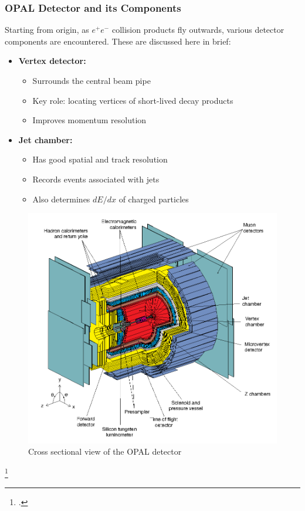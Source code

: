 \documentclass[10pt]{beamer}
\begin{document}
\begin{frame}
\frametitle{OPAL Detector and its Components}
\begin{minipage}{0.5\textwidth}
Starting from origin, as $e^{+}e^{-}$ collision products fly outwards, various detector components are encountered. These are discussed here in brief:
\begin{itemize}
\item \textbf{Vertex detector:} 
\begin{itemize}
\item Surrounds the central beam pipe
\item Key role: locating vertices of short-lived decay products
\item Improves momentum resolution
\end{itemize}
\item \textbf{Jet chamber:}
\begin{itemize}
\item Has good spatial and track resolution
\item Records events associated with jets
\item Also determines $dE/dx$ of charged particles
\end{itemize} 
\end{itemize}
\end{minipage}\hspace{0.5em}
\begin{minipage}{0.45\textwidth}
\begin{figure}
\centering
\includegraphics[width=\textwidth]{OPAL1}
\caption{Cross sectional view of the OPAL detector \footnotemark{}}
\end{figure}
\end{minipage}
\footcitetext{OPAL}
\end{frame}
\end{document}
